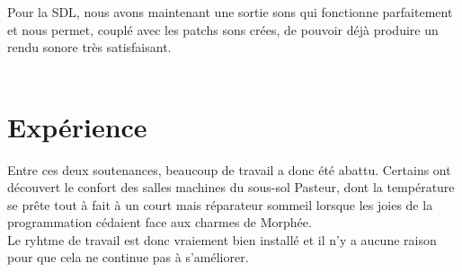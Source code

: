 \newpage

Pour la SDL, nous avons maintenant une sortie sons qui fonctionne parfaitement 
et nous permet, coupl\'e avec les patchs sons cr\'ees, de pouvoir d\'ej\`a 
produire un rendu sonore tr\`es satisfaisant.\\
\\

\section{Exp\'erience}

Entre ces deux soutenances, beaucoup de travail a donc \'et\'e abattu.
Certains ont d\'ecouvert le confort des salles machines du sous-sol
Pasteur, dont la temp\'erature se pr\^ete tout \`a fait \`a un court
mais r\'eparateur sommeil lorsque les joies de la programmation
c\'edaient face aux charmes de Morph\'ee.\\

Le ryhtme de travail est donc vraiement bien install\'e et il n'y a aucune
raison pour que cela ne continue pas \`a s'am\'eliorer. 
